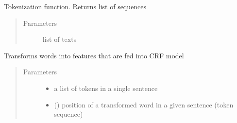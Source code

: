 \documentclass[letterpaper,10pt,english]{sphinxmanual}
\begin{document}
\begin{fulllineitems}
\begin{fulllineitems}
\begin{quote}
\begin{description}
\end{description}\end{quote}

\end{fulllineitems}


\begin{fulllineitems}
\label{\detokenize{index:ner_plugins.NER_CRF.NER_CRF.tokenize_fa}}
Tokenization function. Returns list of sequences
\begin{quote}\begin{description}
\item[{Parameters}] \leavevmode
{} \textendash{} list of texts

\end{description}\end{quote}

\end{fulllineitems}


\begin{fulllineitems}
\label{\detokenize{index:ner_plugins.NER_CRF.NER_CRF.word2features}}
Transforms words into features that are fed into CRF model
\begin{quote}\begin{description}
\item[{Parameters}] \leavevmode\begin{itemize}
\item {} 
 \textendash{} a list of tokens in a single sentence

\item {} 
 () \textendash{} position of a transformed word in a given sentence (token sequence)

\end{itemize}

\end{description}\end{quote}

\end{fulllineitems}


\end{fulllineitems}
\end{document}
